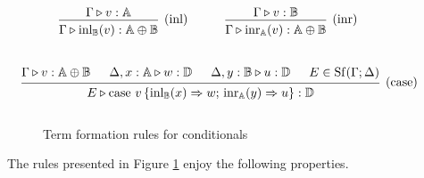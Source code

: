 \documentclass[10pt,a4paper]{amsart}
\theoremstyle{definition}
\theoremstyle{definition}
\theoremstyle{definition}
\theoremstyle{definition}
\theoremstyle{definition}
\theoremstyle{definition}
\begin{document}
\begin{figure}[H]
    \begin{equation*}
    \begin{aligned}
    &\hspace{10pt}
    \begin{prooftree}
        \hypo{\Gamma \vljud v: \typeA}
        \infer1[(inl)]{\Gamma \vljud \inl_{\typeB}(v): \typeA \oplus \typeB}
    \end{prooftree}
    \hspace{30pt}
    \begin{prooftree}
        \hypo{\Gamma \vljud v: \typeB}
        \infer1[(inr)]{\Gamma \vljud \inr_{\typeA}(v): \typeA \oplus \typeB}
    \end{prooftree} 
    \\[20pt]
    &\hspace{-20pt}
    \begin{prooftree}
        \hypo{\Gamma \vljud v: \typeA \oplus \typeB}
        \hypo{\Delta, x: \typeA \vljud w: \typeD}
        \hypo{\Delta, y: \typeB \vljud u: \typeD}
        \hypo{E \in \Shuff(\Gamma; \Delta)}
        \infer4[(case)]{E \vljud \text{case } v\,
        \{\inl_{\typeB}(x) 
            \Rightarrow w ; \,
          \inr_{\typeA}(y) \Rightarrow u
        \}: \typeD}
    \end{prooftree}
    \\[10pt]
    \end{aligned}
    \end{equation*}
    \caption{Term formation rules for conditionals}
    \label{fig:typing_rules_cond}
\end{figure}
The rules presented in Figure \ref{fig:typing_rules_cond} enjoy the following
properties.
\end{document}
